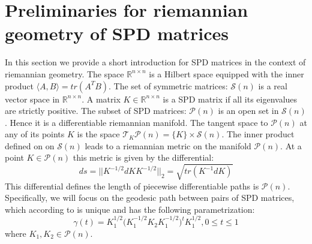 \documentclass[]{article}
\theoremstyle{definition}
\begin{document}
	
	
	\section{Preliminaries for riemannian geometry of SPD matrices}
	\label{sec:RiemannianIntro}
	In this section we provide a short introduction for SPD matrices in the context of riemannian geometry.
	The space $\mathbb{R}^{n\times n}$ is a Hilbert space equipped with the inner product $\langle A,B\rangle = tr(A^TB)$. The set of symmetric matrices: $\mathcal{S}(n)$ is a real vector space in $\mathbb{R}^{n\times n}$. A matrix $K \in \mathbb{R}^{n\times n}$ is a SPD matrix if all its eigenvalues are strictly positive. The subset of SPD matrices: $\mathcal{P}(n)$ is an open set in $\mathcal{S}(n)$. Hence it is a differentiable riemannian manifold. The tangent space to $\mathcal{P}(n)$ at any of its points $K$ is the space $\mathcal{T}_K\mathcal{P}(n) = \{K\} \times \mathcal{S}(n)$. The inner product defined on on $\mathcal{S}(n)$ leads to a riemannian metric on the manifold $\mathcal{P}(n)$. At a point $K \in \mathcal{P}(n)$ this metric is given by the differential:
	\begin{equation}
	\label{eq:metric}
	ds=||K^{-1/2}dKK^{-1/2}||_2 = \sqrt{tr(K^{-1}dK)}
	\end{equation}
	This differential defines the length of piecewise differentiable paths is $\mathcal{P}(n)$. Specifically, we will focus on the geodesic path between pairs of SPD matrices, which according to \cite[equation 6.11]{bhatia2009positive} is unique and has the following parametrization:
	\begin{equation}
	\label{eq:geodesic}
	\gamma(t)= K_1^{1/2}\big( K_1^{-1/2}K_2K_1^{-1/2} )^t K_1^{1/2}, 0\leq t \leq1
	\end{equation}
	where $K_1,K_2 \in \mathcal{P}(n)$.
	
\end{document}
